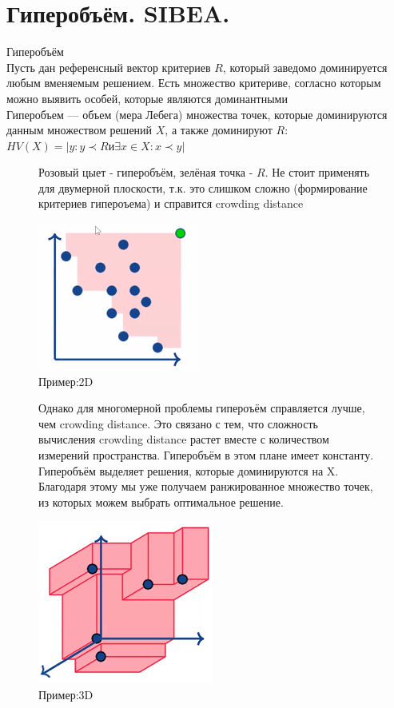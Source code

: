 \section{Гиперобъём. SIBEA.}
Гиперобъём\\
Пусть дан референсный вектор критериев $R$, который заведомо доминируется
любым вменяемым решением. Есть множество критериве, согласно которым можно выявить особей, которые являются доминантными\\
Гиперобъем — объем (мера Лебега) множества точек, которые доминируются
данным множеством решений $X$, а также доминируют $R$:\\
$HV(X) = |{y : y ≺ R и ∃x ∈X : x ≺ y}|$\\

\begin{figure}[!ht]
Розовый цыет - гиперобъём, зелёная точка - $R$. Не стоит применять для двумерной плоскости, т.к. это слишком сложно (формирование критериев гипероъема) и справится crowding distance
\begin{center}
    \includegraphics[width=0.3\linewidth]{images/hypervolume_2D.PNG}
    \caption{Пример:2D}
    \label{fig:mpr}
    
\end{center}
\end{figure}

\begin{figure}[!ht]
Однако для многомерной проблемы гипероъём справляется лучше, чем crowding distance.
Это связано с тем, что сложность вычисления crowding distance растет вместе с количеством измерений пространства. Гиперобъём в этом плане имеет константу.\\
Гиперобъём выделяет решения, которые доминируются на X. Благодаря этому мы уже получаем ранжированное множество точек, из которых можем выбрать оптимальное решение. 
\begin{center}
    \includegraphics[width=0.3\linewidth]{images/hypervolume_3D.PNG}
    \caption{Пример:3D}
    \label{fig:mpr}
    
\end{center}
\end{figure}

